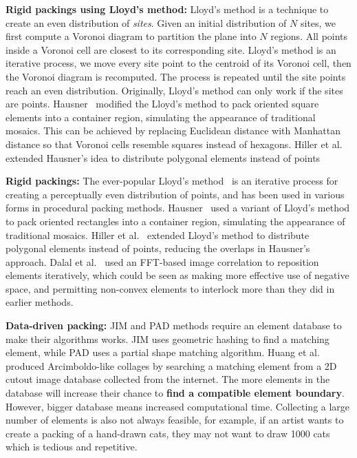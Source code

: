 \textbf{Rigid packings using Lloyd's method:}
Lloyd's method is a technique to create an even distribution of \textit{sites}.
Given an initial distribution of $N$ sites, we first compute a Voronoi diagram to partition the plane into $N$ regions.
All points inside a Voronoi cell are closest to its corresponding site.
Lloyd's method is an iterative process, we move every site point to the centroid of its Voronoi cell, then the Voronoi diagram is recomputed.
The process is repeated until the site points reach an even distribution.
Originally, Lloyd's method can only work if the sites are points.
Hausner~\cite{Hausner2001} modified the Lloyd's method to pack oriented square elements into a container 
region, simulating the appearance of traditional mosaics. 
This can be achieved by replacing Euclidean distance with Manhattan distance so that Voronoi cells resemble squares instead of hexagons.
Hiller et al.~\cite{Hiller2003} extended Hausner's idea to distribute polygonal
elements instead of points 



\textbf{Rigid packings:}
The ever-popular Lloyd's method~\cite{McCool1992}
is an iterative
process for creating a perceptually even distribution of points, and has been
used in various forms in procedural packing methods.
Hausner~\cite{Hausner2001} 
used a variant of Lloyd's method to pack oriented rectangles into a container 
region, simulating the appearance of traditional mosaics.  
Hiller et al.~\cite{Hiller2003} extended Lloyd's method to distribute polygonal
elements instead of points, reducing the overlaps in Hausner's approach.
Dalal et al.~\cite{Dalal2006} used an FFT-based image correlation to reposition
elements iteratively, which could be seen as making more effective use of negative
space, and permitting non-convex elements to interlock more than they did in
earlier methods.


\textbf{Data-driven packing:}
JIM and PAD methods require an element database to make their algorithms works.
JIM uses geometric hashing to find a matching element, 
while PAD uses a partial shape matching algorithm.
Huang et al.~\cite{Huang2011} produced Arcimboldo-like collages
by searching a matching element from a 2D cutout image database collected from the internet.  
The more elements in the database will increase their chance to \textbf{find a compatible element boundary}.
However, bigger database means increased computational time.
Collecting a large number of elements is also not always feasible,
for example, if an artist wants to create a packing of a hand-drawn cats,
they may not want to draw 1000 cats which is tedious and repetitive.

